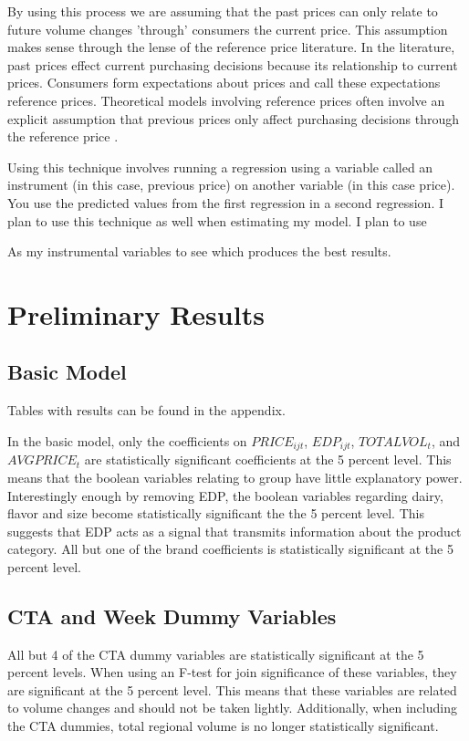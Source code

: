 \documentclass{article}
\begin{document}
By using this process we are assuming that the past prices can only relate to future volume changes 'through' consumers the current price. This assumption makes sense through the lense of the reference price literature. In the literature, past prices effect current purchasing decisions because its relationship to current prices. Consumers form expectations about prices and call these expectations reference prices. Theoretical models involving reference prices often involve an explicit assumption that previous prices only affect purchasing decisions through the reference price \cite{putler}.

Using this technique involves running a regression using a variable called an instrument (in this case, previous price) on another variable (in this case price). You use the predicted values from the first regression in a second regression.  I plan to use this technique as well when estimating my model. I plan to use 


As my instrumental variables to see which produces the best results.

\section{Preliminary Results}

\subsection{Basic Model}

Tables with results can be found in the appendix.

In the basic model, only the coefficients on ${PRICE}_{ijt}$, ${EDP}_{ijt}$, ${TOTALVOL}_t $, and ${AVGPRICE}_{t}$ are statistically significant coefficients at the 5 percent level. This means that the boolean variables relating to group have little explanatory power. Interestingly enough by removing EDP, the boolean variables regarding dairy, flavor and size become statistically significant the the 5 percent level. This suggests that EDP acts as a signal that transmits information about the product category. All but one of the brand coefficients is statistically significant at the 5 percent level.


\subsection{CTA and Week Dummy Variables}

All but 4 of the CTA dummy variables are statistically significant at the 5 percent levels. When using an F-test for join significance of these variables, they are significant at the 5 percent level. This means that these variables are related to volume changes and should not be taken lightly. Additionally, when including the CTA dummies, total regional volume is no longer statistically significant. 
\end{document}
